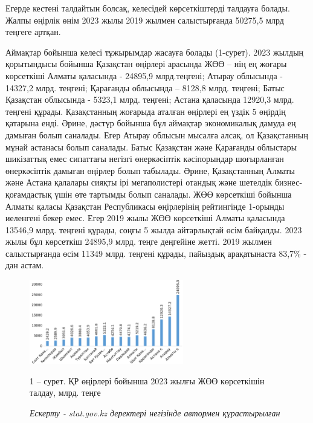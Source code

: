 \begin{multicols}{2}
Егерде кестені талдайтын болсақ, келесідей көрсеткіштерді талдауға
болады. Жалпы өңірлік өнім 2023 жылы 2019 жылмен салыстырғанда 50275,5
млрд теңгеге артқан.

Аймақтар бойынша келесі тұжырымдар жасауға болады (1-сурет). 2023 жылдың
қорытындысы бойынша Қазақстан өңірлері арасында ЖӨӨ -- нің ең жоғары
көрсеткіші Алматы қаласында - 24895,9 млрд.теңгені; Атырау облысында -
14327,2 млрд. теңгені; Қарағанды облысында -- 8128,8 млрд. теңгені;
Батыс Қазақстан облысында - 5323,1 млрд. теңгені; Астана қаласында
12920,3 млрд. теңгені құрады. Қазақстанның жоғарыда аталған өңірлері ең
үздік 5 өңірдің қатарына енді. Әрине, дәстүр бойынша бұл аймақтар
экономикалық дамуда ең дамыған болып саналады. Егер Атырау облысын
мысалға алсақ, ол Қазақстанның мұнай астанасы болып саналады. Батыс
Қазақстан және Қарағанды облыстары шикізаттық емес сипаттағы негізгі
өнеркәсіптік кәсіпорындар шоғырланған өнеркәсіптік дамыған өңірлер болып
табылады. Әрине, Қазақстанның Алматы және Астана қалалары сияқты ірі
мегаполистері отандық және шетелдік бизнес-қоғамдастық үшін өте тартымды
болып саналады. ЖӨӨ көрсеткіші бойынша Алматы қаласы Қазақстан
Республикасы өңірлерінің рейтингінде 1-орынды иеленгені бекер емес. Егер
2019 жылы ЖӨӨ көрсеткіші Алматы қаласында 13546,9 млрд. теңгені құрады,
соңғы 5 жылда айтарлықтай өсім байқалды. 2023 жылы бұл көрсеткіш 24895,9
млрд. теңге деңгейіне жетті. 2019 жылмен салыстырғанда өсім 11349 млрд.
теңгені құрады, пайыздық арақатынаста 83,7\% - дан астам.
\end{multicols}

\begin{figure}[H]
	\centering
	\includegraphics[width=0.6\textwidth]{media/ekon/image1000}
	\caption*{1 -- сурет. ҚР өңірлері бойынша 2023 жылғы ЖӨӨ көрсеткішін
талдау, млрд. теңге}
	\caption*{{\normalfont \emph{Ескерту - stat.gov.kz деректері негізінде автормен құрастырылған}}}
\end{figure}

